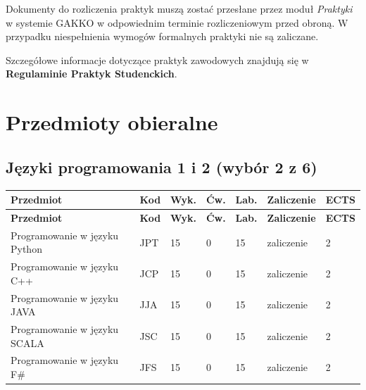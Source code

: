 \documentclass[12pt,a4paper]{article}
\newcommand{\thdrule}{\noalign{\global\setlength{\extrarowheight}{0pt}}}
\newcommand{\thdend}{\noalign{\global\setlength{\extrarowheight}{4pt}}}
\begin{document}
Dokumenty do rozliczenia praktyk muszą zostać przesłane przez moduł \textit{Praktyki} w systemie GAKKO w odpowiednim terminie rozliczeniowym przed obroną. W przypadku niespełnienia wymogów formalnych praktyki nie są zaliczane.

Szczegółowe informacje dotyczące praktyk zawodowych znajdują się w \textbf{Regulaminie Praktyk Studenckich}.

\newpage

\section{Przedmioty obieralne}


\subsection*{Języki programowania 1 i 2 (wybór 2 z 6)}

{\scriptsize
\begin{longtable}{m{5.5cm}m{0.8cm}m{1cm}m{1cm}m{1cm}m{1.7cm}m{0.7cm}}
\thdrule\toprule
\rowcolor{pjatkRed}
{\color{white}\footnotesize\textbf{\vphantom{Ag}Przedmiot}} & {\color{white}\footnotesize\textbf{\vphantom{Ag}Kod}} & {\color{white}\footnotesize\textbf{\vphantom{Ag}Wyk.}} & {\color{white}\footnotesize\textbf{\vphantom{Ag}Ćw.}} & {\color{white}\footnotesize\textbf{\vphantom{Ag}Lab.}} & {\color{white}\footnotesize\textbf{\vphantom{Ag}Zaliczenie}} & {\color{white}\footnotesize\textbf{\vphantom{Ag}ECTS}} \\
\midrule\thdend
\endfirsthead
\thdrule\toprule
\rowcolor{pjatkRed}
{\color{white}\footnotesize\textbf{\vphantom{Ag}Przedmiot}} & {\color{white}\footnotesize\textbf{\vphantom{Ag}Kod}} & {\color{white}\footnotesize\textbf{\vphantom{Ag}Wyk.}} & {\color{white}\footnotesize\textbf{\vphantom{Ag}Ćw.}} & {\color{white}\footnotesize\textbf{\vphantom{Ag}Lab.}} & {\color{white}\footnotesize\textbf{\vphantom{Ag}Zaliczenie}} & {\color{white}\footnotesize\textbf{\vphantom{Ag}ECTS}} \\
\midrule\thdend
\endhead
\rowcolor{tableRowLight} Programowanie w języku Python & JPT & 15 & 0 & 15 & {\scriptsize zaliczenie} & 2 \\
\rowcolor{tableRowAlt} Programowanie w języku C++ & JCP & 15 & 0 & 15 & {\scriptsize zaliczenie} & 2 \\
\rowcolor{tableRowLight} Programowanie w języku JAVA & JJA & 15 & 0 & 15 & {\scriptsize zaliczenie} & 2 \\
\rowcolor{tableRowAlt} Programowanie w języku SCALA & JSC & 15 & 0 & 15 & {\scriptsize zaliczenie} & 2 \\
\rowcolor{tableRowLight} Programowanie w języku F\# & JFS & 15 & 0 & 15 & {\scriptsize zaliczenie} & 2 \\
\bottomrule
\end{longtable}}
\end{document}

